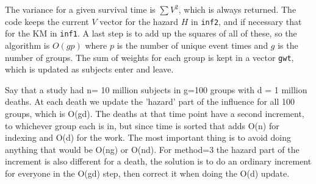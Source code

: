 \documentclass{article}
\newcommand{\code}[1]{\texttt{#1}}
\begin{document}
The variance for a given survival time is $\sum V^2$, which is always returned.
The code keeps the current $V$ vector for the hazard $H$ in \code{inf2}, and if
necessary that for the KM in \code{inf1}.
A last step is to add up the squares of all of these, so the algorithm is
$O(gp)$ where $p$ is the number of unique event times and $g$ is the number
of groups.
The sum of weights for each group is kept in a vector \code{gwt}, which is
updated as subjects enter and leave.

Say that a study had n= 10 million subjects in g=100 groups with
d = 1 million deaths. 
At each death we update the 'hazard' part of the influence for all 100
groups, which is O(gd). 
The deaths at that time point have a second increment, to whichever
group each is in, but since time is sorted that adds O(n) for indexing and
O(d) for the work.  The most important thing is to avoid doing anything 
that would be O(ng) or O(nd).  
For method=3 the hazard part of the increment is also 
different for a death, the solution is to do an ordinary increment for everyone
in the O(gd) step, then correct it when doing the O(d) update.
\end{document}
